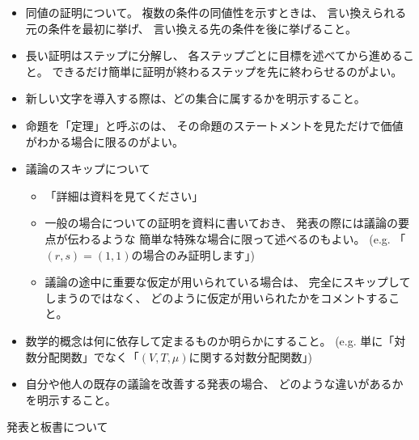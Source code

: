 \documentclass[report, notitlepage]{jlreq}
\begin{document}
\begin{itemize}
    \item 同値の証明について。
        複数の条件の同値性を示すときは、
        言い換えられる元の条件を最初に挙げ、
        言い換える先の条件を後に挙げること。
    \item 長い証明はステップに分解し、
        各ステップごとに目標を述べてから進めること。
        できるだけ簡単に証明が終わるステップを先に終わらせるのがよい。
    \item 新しい文字を導入する際は、どの集合に属するかを明示すること。
    \item 命題を「定理」と呼ぶのは、
        その命題のステートメントを見ただけで価値がわかる場合に限るのがよい。
    \item 議論のスキップについて
        \begin{itemize}
            \item 「詳細は資料を見てください」
            \item 一般の場合についての証明を資料に書いておき、
                発表の際には議論の要点が伝わるような
                簡単な特殊な場合に限って述べるのもよい。
                (e.g. 「$(r, s) = (1, 1)$の場合のみ証明します」)
            \item 議論の途中に重要な仮定が用いられている場合は、
                完全にスキップしてしまうのではなく、
                どのように仮定が用いられたかをコメントすること。
        \end{itemize}
    \item 数学的概念は何に依存して定まるものか明らかにすること。
        (e.g. 単に「対数分配関数」でなく「$(V, T, \mu)$に関する対数分配関数」)
    \item 自分や他人の既存の議論を改善する発表の場合、
        どのような違いがあるかを明示すること。
\end{itemize}

発表と板書について
\end{document}
